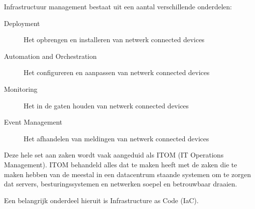 Infrastructuur management bestaat uit een aantal verschillende onderdelen:
\begin{description}
\item[Deployment] Het opbrengen en installeren van netwerk connected devices
\item[Automation and Orchestration] Het configureren en aanpassen van netwerk connected devices
\item[Monitoring] Het in de gaten houden van netwerk connected devices
\item[Event Management] Het afhandelen van meldingen van netwerk connected devices
\end{description}

Deze hele set aan zaken wordt vaak aangeduid als ITOM (IT Operations Management). ITOM behandeld alles dat te maken heeft met de zaken die te maken hebben van de meestal in een datacentrum staande systemen om te zorgen dat servers, besturingssystemen en netwerken soepel en betrouwbaar draaien.

Een belangrijk onderdeel hieruit is Infrastructure as Code (IaC).

